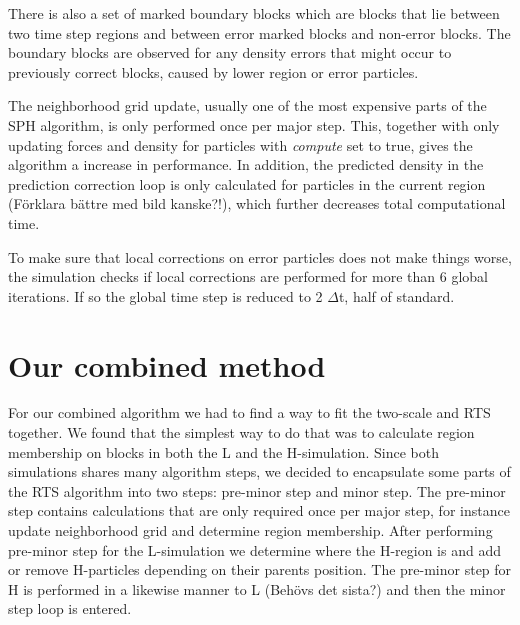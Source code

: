 \documentclass[../../main.tex]{subfiles}
\begin{document}
There is also a set of marked boundary blocks which are blocks that lie between two time step regions and between error marked blocks and non-error blocks. The boundary blocks are observed for any density errors that might occur to previously correct blocks, caused by lower region or error particles. 

The neighborhood grid update, usually one of the most expensive parts of the SPH algorithm, is only performed once per major step. This, together with only updating forces and density for particles with \textit{compute} set to true, gives the algorithm a increase in performance. In addition, the predicted density in the prediction correction loop is only calculated for particles in the current region (Förklara bättre med bild kanske?!), which further decreases total computational time. 

To make sure that local corrections on error particles does not make things worse, the simulation checks if local corrections are performed for more than 6 global iterations. If so the global time step is reduced to 2 $\Delta$t, half of standard.



\section{Our combined method}

For our combined algorithm we had to find a way to fit the two-scale and RTS together. We found that the simplest way to do that was to calculate region membership on blocks in both the L and the H-simulation. Since both simulations shares many algorithm steps, we decided to encapsulate some parts of the RTS algorithm into two steps: pre-minor step and minor step. The pre-minor step contains calculations that are only required once per major step, for instance update neighborhood grid and determine region membership. After performing pre-minor step for the L-simulation we determine where the H-region is and add or remove H-particles depending on their parents position. The pre-minor step for H is performed in a likewise manner to L (Behövs det sista?) and then the minor step loop is entered. 
\end{document}
